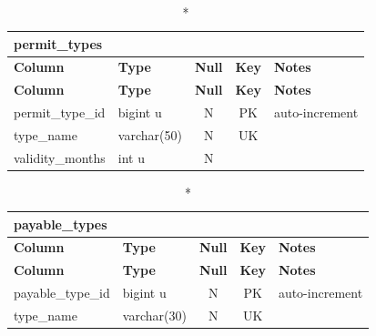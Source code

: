 \vspace{-0.4em}
\begin{longtable}{@{}p{3.4cm}p{2.9cm}c c p{5.6cm}@{}}
\caption*{\textbf{permit\_\allowbreak{}types}}\\
\toprule \textbf{Column} & \textbf{Type} & \textbf{Null} & \textbf{Key} & \textbf{Notes} \\ \midrule \endfirsthead
\toprule \textbf{Column} & \textbf{Type} & \textbf{Null} & \textbf{Key} & \textbf{Notes} \\ \midrule \endhead
\bottomrule \endlastfoot
permit\_\allowbreak{}type\_\allowbreak{}id & bigint u & N & PK & auto-increment \\
type\_\allowbreak{}name & varchar(50) & N & UK &  \\
validity\_\allowbreak{}months & int u & N &  &  \\
\end{longtable}
\vspace{-0.4em}
\begin{longtable}{@{}p{3.4cm}p{2.9cm}c c p{5.6cm}@{}}
\caption*{\textbf{payable\_\allowbreak{}types}}\\
\toprule \textbf{Column} & \textbf{Type} & \textbf{Null} & \textbf{Key} & \textbf{Notes} \\ \midrule \endfirsthead
\toprule \textbf{Column} & \textbf{Type} & \textbf{Null} & \textbf{Key} & \textbf{Notes} \\ \midrule \endhead
\bottomrule \endlastfoot
payable\_\allowbreak{}type\_\allowbreak{}id & bigint u & N & PK & auto-increment \\
type\_\allowbreak{}name & varchar(30) & N & UK &  \\
\end{longtable}
\vspace{-0.4em}
